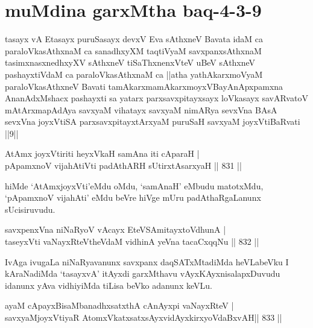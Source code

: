 
\section*{muMdina garxMtha baq-4-3-9}

\begin{shl}
tasayx vA Etasayx puruSasayx devxV Eva sAthxneV Bavata idaM ca paraloVkasAthxnaM ca sanadhxyXM taqtiVyaM savxpanxsAthxnaM tasimxnasxnedhxyXV sAthxneV tiSaThxnenxVteV uBeV sAthxneV pashayxtiVdaM ca paraloVkasAthxnaM ca ||atha yathAkarxmoV\s yaM paraloVkasAthxneV Bavati tamAkarxmamAkarxmoyxVBayAnApxpamxna AnanAdxMshacx pashayxti sa yatarx parxsavxpitayxsayx loVkasayx savARvatoV mAtArxmapAdAya savxyaM vihatayx savxyaM nimARya sevxVna BAsA sevxVna joyxVtiSA parxsavxpitayxtArxyaM puruSaH savxyaM joyxVtiBaRvati ||9||
\end{shl}



\begin{shl}
AtAmx joyxVtiriti heyxVkaH samAna iti cAparaH | \\
pApamxnoV vijahAtiVti padAthARH sUtirxtAsarxyaH \hfill||  831 ||  
\end{shl}

\begin{artha}
hiMde `AtAmxjoyxVti'eMdu oMdu, `samAnaH' eMbudu matotxMdu, `pApamxnoV vijahAti' eMdu beVre hiVge mUru padAthaRgaLanunx sUcisiruvudu.
\end{artha}

\begin{shl}
savxpenxVna niNaRyoV vAcayx EteVSAmitayxtoV\s dhunA | \\
taseyxVti vaNayxRteV\s theVdaM vidhinA yeVna tacaCxqqNu \hfill||  832 ||  
\end{shl}

\begin{artha}
IvAga ivugaLa niNaRyavanunx savxpanx daqSATxMtadiMda heVLabeVku I kAraNadiMda `tasayxvA' itAyxdi garxMthavu vAyxKAyxnisalapxDuvudu idanunx yAva vidhiyiMda tiLisa beVko adanunx keVLu.
\end{artha}

\begin{shl}
ayaM cApayxBisaMbanadhxsatxthA cAnAyx\s pi vaNayxRteV | \\
savxyaMjoyxVtiyaR AtomxVkatxsatxsAyxvidAyxkirxyoVdaBxvAH\hfill ||  833 ||  
\end{shl}
				
